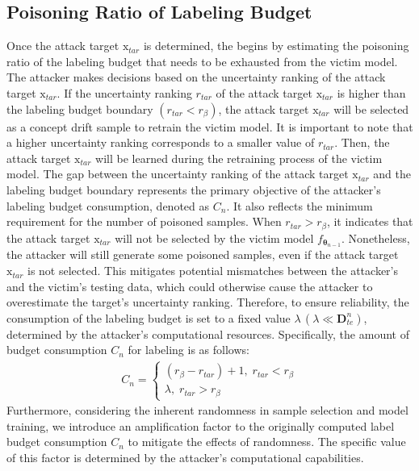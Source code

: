 \subsection{Poisoning Ratio of Labeling Budget}
\label{Sec: Surrogate Model Training}
Once the attack target $\bm{\mathrm{x}}_{tar}$ is determined, the \pandora begins by estimating the poisoning ratio of the labeling budget that needs to be exhausted from the victim model.
The attacker makes decisions based on the uncertainty ranking of the attack target $\bm{\mathrm{x}}_{tar}$.
If the uncertainty ranking $r_{tar}$ of the attack target $\bm{\mathrm{x}}_{tar}$ is higher than the labeling budget boundary $(r_{tar} < r_{\beta})$, the attack target $\bm{\mathrm{x}}_{tar}$ will be selected as a concept drift sample to retrain the victim model.
It is important to note that a higher uncertainty ranking corresponds to a smaller value of $r_{tar}$.
Then, the attack target $\bm{\mathrm{x}}_{tar}$ will be learned during the retraining process of the victim model.
The gap between the uncertainty ranking of the attack target $\bm{\mathrm{x}}_{tar}$ and the labeling budget boundary represents the primary objective of the attacker’s labeling budget consumption, denoted as $C_{n}$.
It also reflects the minimum requirement for the number of poisoned samples.
When $r_{tar} > r_{\beta}$, it indicates that the attack target $\bm{\mathrm{x}}_{tar}$ will not be selected by the victim model $f_{\bm{\theta}_{n-1}}$.
Nonetheless, the attacker will still generate some poisoned samples, even if the attack target $\bm{\mathrm{x}}_{tar}$ is not selected.
This mitigates potential mismatches between the attacker’s and the victim’s testing data, which could otherwise cause the attacker to overestimate the target’s uncertainty ranking.
Therefore, to ensure reliability, the consumption of the labeling budget is set to a fixed value $\lambda \, (\lambda \ll \bm{D}_{te}^{n})$, determined by the attacker’s computational resources.
Specifically, the amount of budget consumption $C_{n}$ for labeling is as follows:
\begin{align}
	C_{n} =
	\begin{cases} 
		(r_{\beta}-r_{tar}) + 1, \; r_{tar} < r_{\beta} \\
		\lambda , \; r_{tar} > r_{\beta}
	\end{cases}
\end{align}
Furthermore, considering the inherent randomness in sample selection and model training, we introduce an amplification factor to the originally computed label budget consumption $C_{n}$ to mitigate the effects of randomness.
The specific value of this factor is determined by the attacker's computational capabilities.

